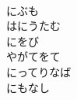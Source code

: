 \documentclass[10pt,b5j]{tarticle} %
\begin{document}
\begin{enumerate}
\begin{minipage}[c]{\blocksize}
        \vspace{\linespace}
        \item~\\
        にぶも\\
        はにうたむ\\
        にをび\\
        やがてをて\\
        にってりなば\\
        にもなし
    
    \end{minipage}
\end{enumerate} %
\end{document}

